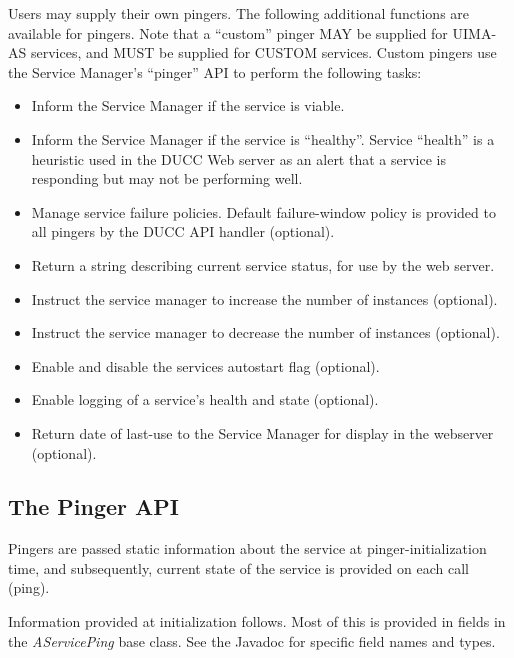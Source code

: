       Users may supply their own pingers.  The following additional functions are available for
      pingers.  Note that a ``custom'' pinger MAY be supplied for UIMA-AS services, and
      MUST be supplied for CUSTOM services.  Custom pingers use the Service Manager's
      ``pinger'' API to perform the following tasks:
      \begin{itemize}
        \item Inform the Service Manager if the service is viable.
        \item Inform the Service Manager if the service is ``healthy''.  Service ``health''
          is a heuristic used in the DUCC Web server as an alert that a service 
          is responding but may
          not be performing well.
        \item Manage service failure policies. Default failure-window policy is
          provided to all pingers by the DUCC API handler (optional).
        \item Return a string describing current service status, for use by the
          web server.
        \item Instruct the service manager to increase the number of instances (optional).
        \item Instruct the service manager to decrease the number of instances (optional).
        \item Enable and disable the services autostart flag (optional).
        \item Enable logging of a service's health and state (optional).
        \item Return date of last-use to the Service Manager for display in the
          webserver (optional).
      \end{itemize}

      \subsection{The Pinger API}

      Pingers are passed static information about the service at pinger-initialization
      time, and subsequently, current state of the service is provided on each call (ping).

      Information provided at initialization follows.  Most of this is
      provided in fields in the {\em AServicePing} base class.  See the Javadoc for 
      specific field names and types.

